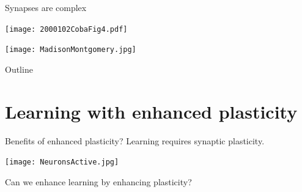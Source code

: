 \documentclass[final]{beamer}%
\begin{document}

\begin{frame}{Synapses are complex}
%
 \parbox[t]{0.45\linewidth}{%
 \texttt{[image: 2000102CobaFig4.pdf]}

 }
 \hspace{0.05\linewidth}
 \parbox[t]{0.45\linewidth}{%
 \hfill
 \texttt{[image: MadisonMontgomery.jpg]}

 }
%
\end{frame}


\begin{frame}{Outline}
%
 \tableofcontents%
%
%
\end{frame}


\section{Learning with enhanced plasticity}


\begin{frame}{Benefits of enhanced plasticity?}
%
 Learning requires synaptic plasticity.
 \begin{center}
   \texttt{[image: NeuronsActive.jpg]}
 \end{center}
 Can we enhance learning by enhancing plasticity?

 \vp
 \begin{center}
 \end{center}
%
\end{frame}
\end{document}
